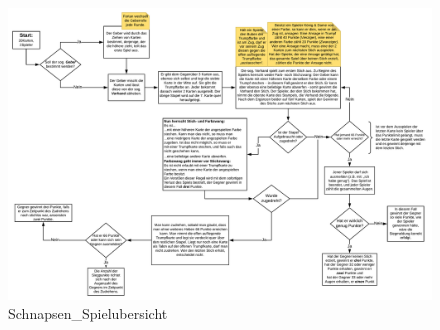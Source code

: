 \begin{landscape}
    \begin{figure}
        \centering
        \noindent\includegraphics[width=\linewidth,height=.9\textheight,keepaspectratio]{fig/SPOILER_Schnapsen_Spielubersicht.pdf}
        \caption[Beispielbild]{Schnapsen_Spielubersicht}
        \label{Schnapsen_Spielubersicht}
    \end{figure}
\end{landscape}


